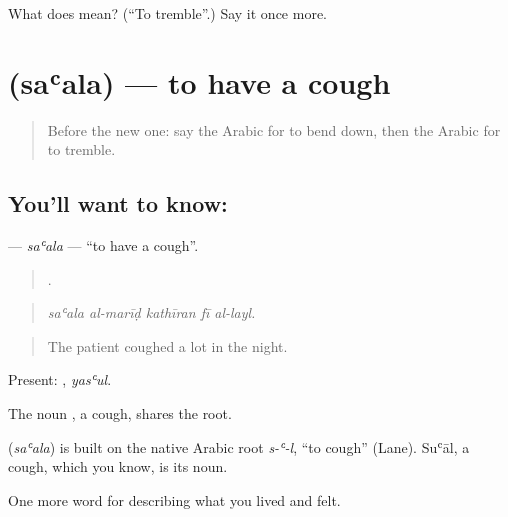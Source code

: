 \begin{tcolorbox}[breakable,colback=teal!4,colframe=teal!35!black,title={Before you move on}]
What does  mean? (\textquotedblleft{}To tremble\textquotedblright{}.) Say it once more.
\end{tcolorbox}
\section[\texorpdfstring{\ar{سعل} (saʿala)}{سعل (saʿala)}]{ (saʿala) — to have a cough}

\label{lesson:AR-C516-saala}



\begin{quote}
Before the new one: say the Arabic for to bend down, then the Arabic for to tremble.
\end{quote}

\subsection*{You'll want to know: }
\textbf{} — \emph{saʿala} — \textquotedblleft{}to have a cough\textquotedblright{}.

\begin{quote}
    .
\end{quote}

\begin{quote}
\emph{saʿala al-marīḍ kathīran fī al-layl.}
\end{quote}

\begin{quote}
The patient coughed a lot in the night.
\end{quote}

Present: , \emph{yasʿul}.

The noun , a cough, shares the root.

\begin{cousinweb}
\textbf{} (\emph{saʿala}) is built on the native Arabic root \emph{s-ʿ-l}, \textquotedblleft{}to cough\textquotedblright{} (Lane). Suʿāl, a cough, which you know, is its noun.
\end{cousinweb}

\begin{grammarlens}[title={What you've built}]
One more word for describing what you lived and felt.
\end{grammarlens}

